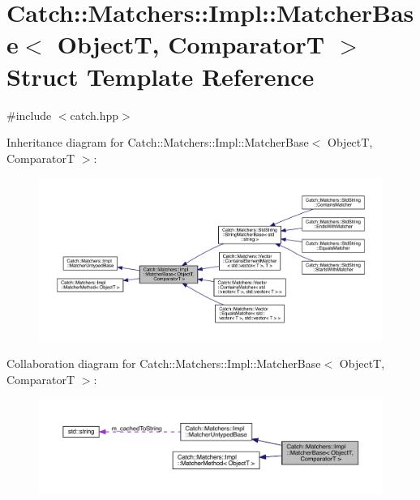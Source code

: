 \hypertarget{struct_catch_1_1_matchers_1_1_impl_1_1_matcher_base}{}\section{Catch\+:\+:Matchers\+:\+:Impl\+:\+:Matcher\+Base$<$ ObjectT, ComparatorT $>$ Struct Template Reference}
\label{struct_catch_1_1_matchers_1_1_impl_1_1_matcher_base}


{\ttfamily \#include $<$catch.\+hpp$>$}



Inheritance diagram for Catch\+:\+:Matchers\+:\+:Impl\+:\+:Matcher\+Base$<$ ObjectT, ComparatorT $>$\+:
\nopagebreak
\begin{figure}[H]
\begin{center}
\leavevmode
\includegraphics[width=350pt]{struct_catch_1_1_matchers_1_1_impl_1_1_matcher_base__inherit__graph}
\end{center}
\end{figure}


Collaboration diagram for Catch\+:\+:Matchers\+:\+:Impl\+:\+:Matcher\+Base$<$ ObjectT, ComparatorT $>$\+:
\nopagebreak
\begin{figure}[H]
\begin{center}
\leavevmode
\includegraphics[width=350pt]{struct_catch_1_1_matchers_1_1_impl_1_1_matcher_base__coll__graph}
\end{center}
\end{figure}

